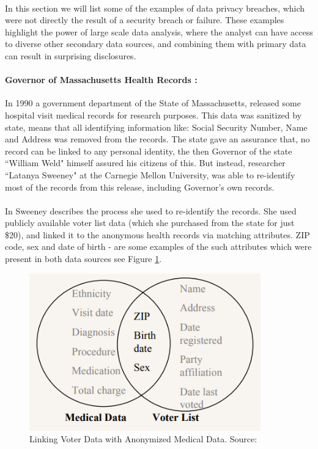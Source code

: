 \documentclass[12pt]{report}
\theoremstyle{named}
\begin{document}
\paragraph{}
 In this section we will list some of the examples of data privacy breaches, which were not directly the result of a security breach or failure. These examples highlight the power of large scale data analysis, where the analyst can have access to diverse other secondary data sources, and combining them with primary data can result in surprising disclosures.
\paragraph{Governor of Massachusetts Health Records \cite{sweeney2000uniqueness}:\\}
In 1990 a government department of the State of Massachusetts, released some hospital visit medical records for research purposes. This data was sanitized by state, means that all identifying information like: Social Security Number, Name and Address was removed from the records. The state gave an assurance that, no record can be linked to any personal identity, the then Governor of the state ``William Weld" himself assured his citizens of this. But instead, researcher ``Latanya Sweeney" at the Carnegie Mellon University, was able to re-identify most of the records from this release, including Governor's own records. 
\paragraph{}
In \cite{sweeney2000uniqueness} Sweeney describes the process she used to re-identify the records. She used publicly available voter list data (which she purchased from the state for just \$20), and linked it to the anonymous health records via matching attributes. ZIP code, sex and  date of birth - are some examples of the such attributes which were present in both data sources see Figure \ref{fig:voterMedical}.

\begin{figure}[ht]
\centering
        \includegraphics[width=100mm,scale=0.5]{Images/GovMassReId.PNG}
    \caption{Linking Voter Data with Anonymized Medical Data. Source:\cite{sweeney2000uniqueness}}
    \label{fig:voterMedical}
\end{figure}
\end{document}
